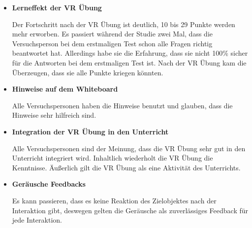 \begin{itemize}
    \item \textbf{Lerneffekt der VR Übung}
    
    Der Fortschritt nach der VR Übung ist deutlich, 10 bis 29 Punkte werden mehr erworben. Es passiert während der Studie zwei Mal, dass die Versuchsperson bei dem erstmaligen Test schon alle Fragen richtig beantwortet hat. Allerdings habe sie die Erfahrung, dass sie nicht 100\% sicher für die Antworten bei dem erstmaligen Test ist. Nach der VR Übung kam die Überzeugen, dass sie alle Punkte kriegen könnten.
    
    \item \textbf{Hinweise auf dem Whiteboard}
    
    Alle Versuchspersonen haben die Hinweise benutzt und glauben, dass die Hinweise sehr hilfreich sind.
    
    \item \textbf{Integration der VR Übung in den Unterricht}
    
    Alle Versuchspersonen sind der Meinung, dass die VR Übung sehr gut in den Unterricht integriert wird. Inhaltlich wiederholt die VR Übung die Kenntnisse. Äußerlich gilt die VR Übung als eine Aktivität des Unterrichts.
    
    \item \textbf{Geräusche Feedbacks}
    
    Es kann passieren, dass es keine Reaktion des Zielobjektes nach der Interaktion gibt, deswegen gelten die Geräusche als zuverlässiges Feedback für jede Interaktion.
    
\end{itemize}

